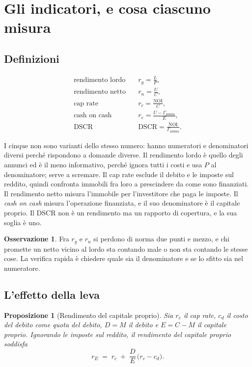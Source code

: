 \documentclass[11pt,a4paper]{article}
\theoremstyle{definition}
\newtheorem{osservazione}[definizione]{Osservazione}
\theoremstyle{plain}
\newtheorem{proposizione}[definizione]{Proposizione}
\begin{document}
\section{Gli indicatori, e cosa ciascuno misura}

\subsection{Definizioni}

\begin{align}
\text{rendimento lordo} \quad & r_g = \frac{L}{P}, \label{eq:lordo}\\
\text{rendimento netto} \quad & r_n = \frac{U}{C}, \label{eq:netto}\\
\text{cap rate} \quad & r_c = \frac{\mathrm{NOI}}{C}, \label{eq:cap}\\
\text{cash on cash} \quad & r_e = \frac{U - \Gamma_{\text{annua}}}{E}, \label{eq:coc}\\
\text{DSCR} \quad & \mathrm{DSCR} = \frac{\mathrm{NOI}}{\Gamma_{\text{annua}}}. \label{eq:dscr}
\end{align}

I cinque non sono varianti dello stesso numero: hanno numeratori e denominatori diversi perché rispondono a domande diverse. Il rendimento lordo è quello degli annunci ed è il meno informativo, perché ignora tutti i costi e usa $P$ al denominatore; serve a scremare. Il cap rate esclude il debito e le imposte sul reddito, quindi confronta immobili fra loro a prescindere da come sono finanziati. Il rendimento netto misura l'immobile per l'investitore che paga le imposte. Il \emph{cash on cash} misura l'operazione finanziata, e il suo denominatore è il capitale proprio. Il DSCR non è un rendimento ma un rapporto di copertura, e la sua soglia è uno.

\begin{osservazione}
Fra $r_g$ e $r_n$ si perdono di norma due punti e mezzo, e chi promette un netto vicino al lordo sta contando male o non sta contando le stesse cose. La verifica rapida è chiedere quale sia il denominatore e se lo sfitto sia nel numeratore.
\end{osservazione}

\subsection{L'effetto della leva}

\begin{proposizione}[Rendimento del capitale proprio]
Sia $r_c$ il cap rate, $c_d$ il costo del debito come quota del debito, $D=M$ il debito e $E=C-M$ il capitale proprio. Ignorando le imposte sul reddito, il rendimento del capitale proprio soddisfa
\begin{equation}
r_E \;=\; r_c \;+\; \frac{D}{E}\,\big(r_c - c_d\big).
\label{eq:leva}
\end{equation}
\end{proposizione}
\end{document}
